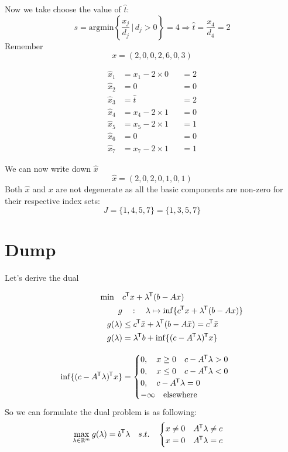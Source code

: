 \documentclass{article}
\newcommand*{\tran}{^{\mkern-1.5mu\mathsf{T}}}%
\begin{document}
	 Now we take choose the value of $\hat t $:
	 \begin{equation}
	 	s = \mathrm{argmin}\left \{\frac{x_j}{d_j} \, \vert \, d_j > 0  \right \} = 4  \Rightarrow \hat t = \frac{x_4}{d_4} = 2
	 \end{equation}
	 	Remember \[x = (2,0,0,2,6,0,3)\]
	\clearpage
	\begin{paracol}{2}
			\begin{alignat*}{2}
			\hat x_1 &= x_1 - 2\times 0 &&=2 \\
			\hat x_2 &= 0  &&=0 \\
			\hat x_3 &= \hat t &&= 2 \\
			\hat x_4 &= x_4 - 2\times 1 &&= 0\\
			\hat x_5 &= x_5 - 2\times1 &&=1 \\
			\hat x_6 &= 0 &&= 0\\
			\hat  x_7 &= x_7 - 2\times1 &&=1   
			\end{alignat*}

		
	\switchcolumn
	\vspace{5ex}
	We can now write down $\hat x$
		\begin{equation*}
		\hat x = (2,0,2,0,1,0,1)
		\end{equation*}
    Both $\hat x$ and $x$ are not degenerate as all the basic components are non-zero for their respective index sets: \\
    \[ J= \{1,4,5,7\} =\{1,3,5,7\}\]
	\end{paracol}
	
	\clearpage
	\section*{Dump}
	Let's derive the dual
	
	\begin{align*}
	\min\quad  &c\tran x + \lambda\tran (b-Ax)\\
	g &\quad : \quad \lambda \mapsto \inf \{c\tran x + \lambda \tran (b - Ax)\}\\
	g(\lambda) &\leq c\tran \bar x + \lambda \tran (b - A \bar x) = c\tran \bar x\\
	g(\lambda) &= \lambda \tran b  + \inf \{(c-A\tran \lambda)\tran x \}\\[2ex]
	\inf \{ (c- A\tran \lambda)\tran x   \} &= \begin{cases} 0, \quad x \geq 0 \quad c - A\tran \lambda > 0\\
	0, \quad x \leq 0 \quad c - A\tran \lambda < 0 \\
	0, \quad c- A\tran \lambda =0 \quad \\
	-\infty \quad \text{elsewhere}
	\end{cases}
	\end{align*}
	So we can formulate the dual problem is as following:
	\begin{equation}
	\max_{\lambda \in \mathbb{R}^m} g(\lambda) = b\tran \lambda \quad s.t. \quad \begin{cases}  x \neq 0 \quad A\tran \lambda \neq c \\
	x = 0 \quad A\tran \lambda =c\end{cases}
	\end{equation}
	
\end{document}
